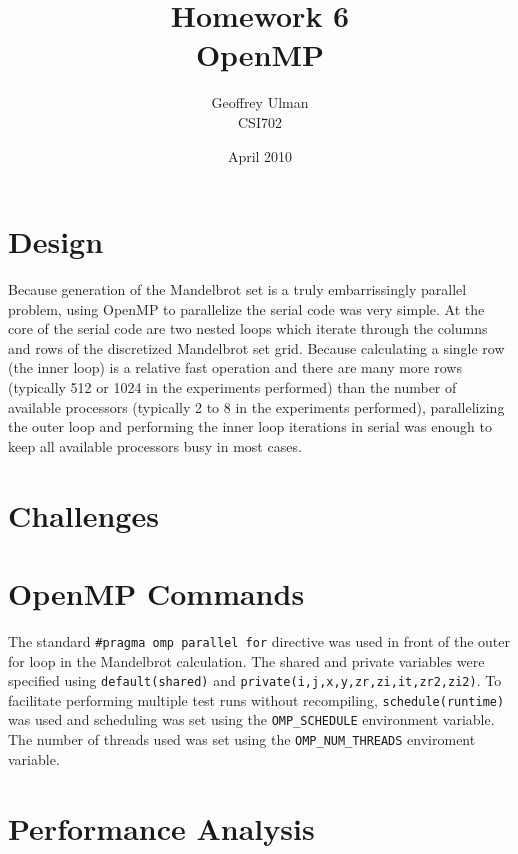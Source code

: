 \documentclass{article}
\begin{document}
\title{Homework 6\\
       OpenMP}
\author{Geoffrey Ulman\\
        CSI702}
\date{April 2010}
\maketitle

\section{Design}
Because generation of the Mandelbrot set is a truly embarrissingly parallel problem, using OpenMP to parallelize the serial code was very simple. At the core of the serial code are two nested loops which iterate through the columns and rows of the discretized Mandelbrot set grid. Because calculating a single row (the inner loop) is a relative fast operation and there are many more rows (typically 512 or 1024 in the experiments performed) than the number of available processors (typically 2 to 8 in the experiments performed), parallelizing the outer loop and performing the inner loop iterations in serial was enough to keep all available processors busy in most cases.

\section{Challenges}


\section{OpenMP Commands}
The standard \verb!#pragma omp parallel for! directive was used in front of the outer for loop in the Mandelbrot calculation. The shared and private variables were specified using \verb!default(shared)! and \verb!private(i,j,x,y,zr,zi,it,zr2,zi2)!. To facilitate performing multiple test runs without recompiling, \verb!schedule(runtime)! was used and scheduling was set using the \verb!OMP_SCHEDULE! environment variable. The number of threads used was set using the \verb!OMP_NUM_THREADS! enviroment variable.

\section{Performance Analysis}
\end{document}
